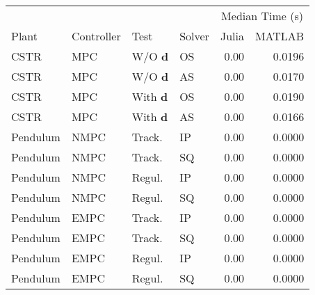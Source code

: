 \begin{tabular}{llllrr}
	
\toprule %

	  &	& & & \multicolumn{2}{c}{Median Time (s)} \\ \cmidrule(l){5-6}
Plant & Controller & Test & Solver & Julia & MATLAB \\
\midrule %

CSTR		& MPC	& W/O $\mathbf{d}$	& OS & \num{0.00} & \num{0.0196}	\\
CSTR		& MPC	& W/O $\mathbf{d}$	& AS & \num{0.00} & \num{0.0170}	\\
CSTR		& MPC	& With $\mathbf{d}$ & OS & \num{0.00} & \num{0.0190}	\\
CSTR		& MPC	& With $\mathbf{d}$ & AS & \num{0.00} & \num{0.0166}	\\
Pendulum 	& NMPC	& Track. 	   		& IP & \num{0.00} & \num{0.0000}	\\
Pendulum 	& NMPC	& Track. 	   		& SQ & \num{0.00} & \num{0.0000}	\\
Pendulum    & NMPC	& Regul. 			& IP & \num{0.00} & \num{0.0000} 	\\
Pendulum    & NMPC	& Regul. 			& SQ & \num{0.00} & \num{0.0000} 	\\
Pendulum    & EMPC	& Track.			& IP & \num{0.00} & \num{0.0000} 	\\
Pendulum    & EMPC	& Track.			& SQ & \num{0.00} & \num{0.0000} 	\\
Pendulum	& EMPC	& Regul. 			& IP & \num{0.00} & \num{0.0000}  	\\
Pendulum	& EMPC	& Regul. 			& SQ & \num{0.00} & \num{0.0000}  	\\
	
\bottomrule %
	
\end{tabular}